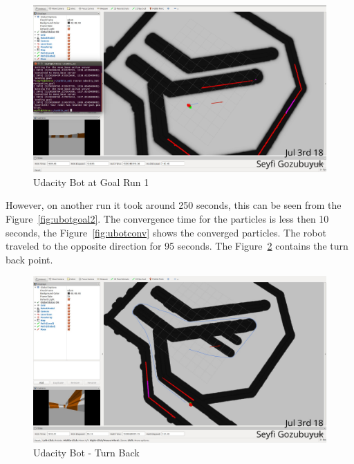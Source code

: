 \documentclass[10pt,journal,compsoc]{IEEEtran}
\begin{document}
\begin{figure}[thpb]
      \centering
      \includegraphics[width=\linewidth]{figures/UdacityBotGoal1.png}
      \caption{Udacity Bot at Goal Run 1}
      \label{fig:ubotgoal1}
\end{figure}


However, on another run it took around 250 seconds, this can be seen from the Figure~\ref{fig:ubotgoal2}. The convergence time for the particles is less then 10 seconds, the Figure~\ref{fig:ubotconv} shows the converged particles. The robot traveled to the opposite direction for 95 seconds. The Figure~\ref{fig:ubotturn} contains the turn back point.

\begin{figure}[thpb]
      \centering
      \includegraphics[width=\linewidth]{figures/UdacityBotTurn.png}
      \caption{Udacity Bot - Turn Back}
      \label{fig:ubotturn}
\end{figure}
\end{document}
